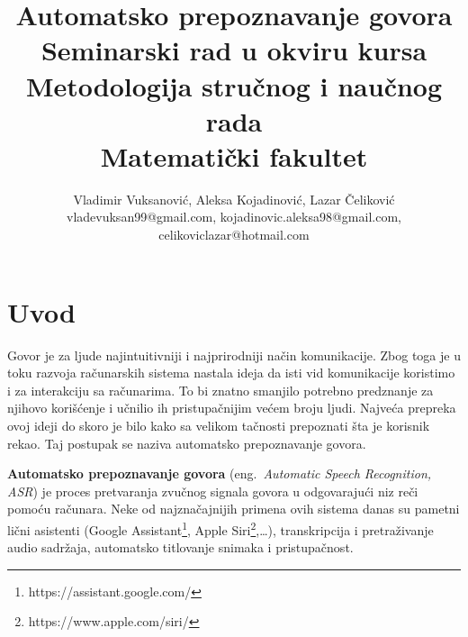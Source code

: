 \documentclass[a4paper]{article}
\begin{document}
\title{Automatsko prepoznavanje govora\\ \small{Seminarski rad u okviru kursa\\Metodologija stručnog i naučnog rada\\Matematički fakultet}}

\author{Vladimir Vuksanović, Aleksa Kojadinović, Lazar Čeliković\\vladevuksan99@gmail.com,  kojadinovic.aleksa98@gmail.com,  \\celikoviclazar@hotmail.com}


\maketitle


\bigskip

\tableofcontents

\newpage

\section{Uvod}
\label{sec:uvod}

Govor je za ljude najintuitivniji i najprirodniji način komunikacije. 
Zbog toga je u toku razvoja računarskih sistema nastala ideja da isti vid komunikacije koristimo i za interakciju sa računarima.
To bi znatno smanjilo potrebno predznanje za njihovo korišćenje i učnilio ih pristupačnijim većem broju ljudi. 
Najveća prepreka ovoj ideji do skoro je bilo kako sa velikom tačnosti prepoznati šta je korisnik rekao.
Taj postupak se naziva automatsko prepoznavanje govora.

\textbf{Automatsko prepoznavanje govora} (eng.~{\em Automatic Speech Recognition, ASR}) je proces pretvaranja zvučnog signala govora u odgovarajući niz reči pomoću računara.
Neke od najznačajnijih primena ovih sistema danas su pametni lični asistenti (Google Assistant\footnote{https://assistant.google.com/}, Apple Siri\footnote{https://www.apple.com/siri/},\dots), transkripcija i pretraživanje audio sadržaja, automatsko titlovanje snimaka i pristupačnost.
\end{document}
